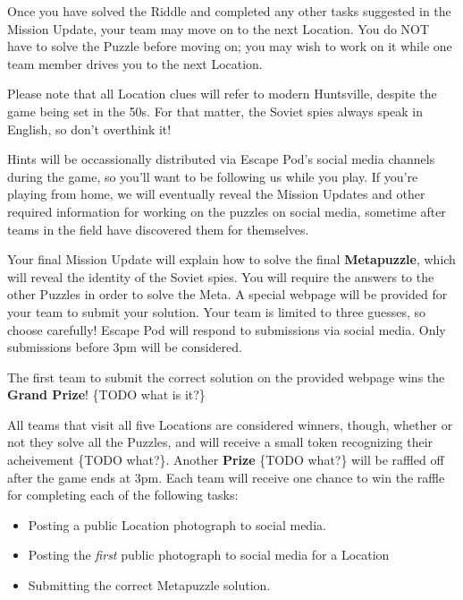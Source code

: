 \documentclass{puzzlehunt}
\begin{document}
Once you have solved the Riddle and completed any other tasks suggested in
the Mission Update, your team may move on to the next Location. You do NOT have
to solve the Puzzle before moving on; you may wish to work on it while one team member
drives you to the next Location.

Please note that all Location clues will refer to
modern Huntsville, despite the game being set in the 50s. For that matter,
the Soviet spies always speak in English, so don't overthink it!

Hints will be occassionally distributed via Escape Pod's social media channels
during the game, so you'll want to be following us while you play. If you're playing
from home, we will eventually reveal the Mission Updates and other required information
for working on the puzzles on social media, sometime after teams in the field have
discovered them for themselves.


Your final Mission Update will explain how to solve the final
\textbf{Metapuzzle}, which will reveal the identity of the Soviet spies.
You will require the answers to the other Puzzles in order to solve the Meta.
A special webpage will be provided for your team to submit your solution. Your
team is limited to three guesses, so choose carefully! Escape Pod will respond
to submissions via social media. Only submissions before 3pm will be considered.


The first team to submit the correct solution on the provided webpage wins the
\textbf{Grand Prize}! \{TODO what is it?\}

All teams that visit all five Locations are considered winners, though, whether
or not they solve all the Puzzles, and will receive a small token recognizing
their acheivement \{TODO what?\}. Another \textbf{Prize} \{TODO what?\} will be
raffled off after the game ends at 3pm. Each team will receive one chance to
win the raffle for completing each of the following tasks:

\begin{itemize}
  \item Posting a public Location photograph to social media.
  \item Posting the \textit{first} public photograph to social media for a Location
  \item Submitting the correct Metapuzzle solution.
\end{itemize}
\end{document}
